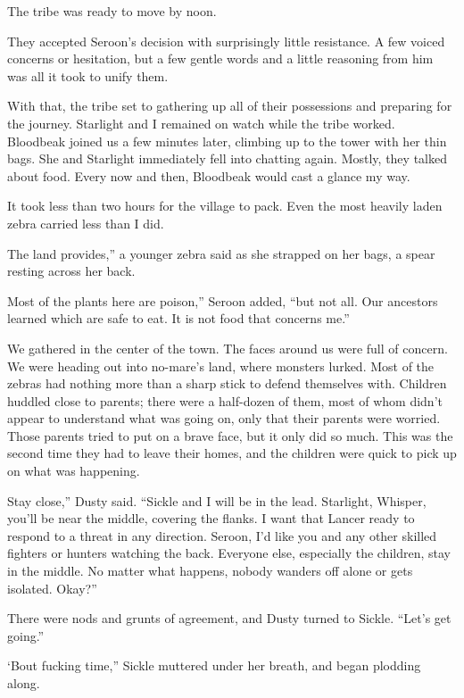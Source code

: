 The tribe was ready to move by noon.

They accepted Seroon’s decision with surprisingly little resistance. A few voiced concerns or hesitation, but a few gentle words and a little reasoning from him was all it took to unify them.

With that, the tribe set to gathering up all of their possessions and preparing for the journey. Starlight and I remained on watch while the tribe worked. Bloodbeak joined us a few minutes later, climbing up to the tower with her thin bags. She and Starlight immediately fell into chatting again. Mostly, they talked about food. Every now and then, Bloodbeak would cast a glance my way.

It took less than two hours for the village to pack. Even the most heavily laden zebra carried less than I did.

\leavevmode{}The land provides,” a younger zebra said as she strapped on her bags, a spear resting across her back.

\leavevmode{}Most of the plants here are poison,” Seroon added, “but not all. Our ancestors learned which are safe to eat. It is not food that concerns me.”

We gathered in the center of the town. The faces around us were full of concern. We were heading out into no-mare’s land, where monsters lurked. Most of the zebras had nothing more than a sharp stick to defend themselves with. Children huddled close to parents; there were a half-dozen of them, most of whom didn’t appear to understand what was going on, only that their parents were worried. Those parents tried to put on a brave face, but it only did so much. This was the second time they had to leave their homes, and the children were quick to pick up on what was happening.

\leavevmode{}Stay close,” Dusty said. “Sickle and I will be in the lead. Starlight, Whisper, you’ll be near the middle, covering the flanks. I want that Lancer ready to respond to a threat in any direction. Seroon, I’d like you and any other skilled fighters or hunters watching the back. Everyone else, especially the children, stay in the middle. No matter what happens, nobody wanders off alone or gets isolated. Okay?”

There were nods and grunts of agreement, and Dusty turned to Sickle. “Let’s get going.”

\leavevmode{}‘Bout fucking time,” Sickle muttered under her breath, and began plodding along.


